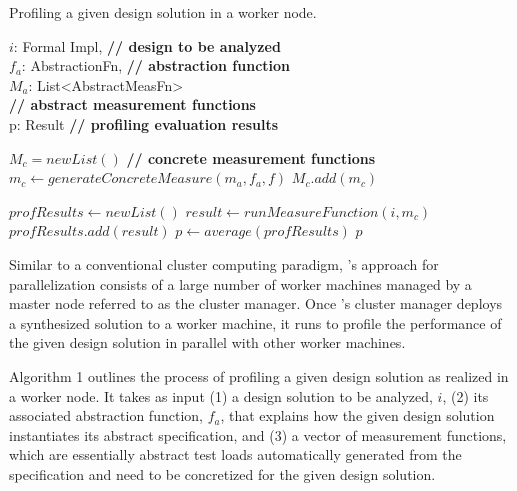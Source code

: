 \documentclass{sig-alternate}
\begin{document}
\begin{algorithm}[tb]
\caption{Profiling a given design solution in a worker node.} %
\label{alg:para_eval}
\begin{algorithmic}[1]
\REQUIRE $i$: Formal Impl, \textcolor{comments}{\textbf{// design to be analyzed}} \\
 		 $f_a$: AbstractionFn, \textcolor{comments}{\textbf{// abstraction function}} \\
		$M_a$: List<AbstractMeasFn> \\\textcolor{comments}{\textbf{// abstract measurement functions}} \\ 
\ENSURE p: Result \textcolor{comments}{\textbf{// profiling evaluation results}}

\STATE $M_c = new List()$ \textcolor{comments}{\textbf{// concrete measurement functions}} \\ 
	\STATE $m_c \gets generateConcreteMeasure(m_a, f_a, f)$
	\STATE $M_c.add(m_c)$
\ENDFOR

\STATE $profResults \gets new List()$
		\STATE $result \gets runMeasureFunction(i, m_c)$
		\STATE $profResults.add(result)$
	\ENDFOR
\ENDFOR
\STATE $p \gets average(profResults)$
\RETURN $p$
\end{algorithmic}
\end{algorithm}

Similar to a conventional cluster computing paradigm, \@approach's approach for parallelization  consists of a large number of worker machines managed by a master node referred to as the cluster manager.
Once \@approach's cluster manager deploys a synthesized solution to a worker machine,
it runs to profile the performance of the given design solution in parallel with other worker machines.

Algorithm 1 outlines the process of profiling a given design solution as realized in a worker node. 
It takes as input (1) a design solution to be analyzed, $i$, (2) its associated abstraction function, $f_a$, that explains how the given design solution instantiates its abstract specification, and (3) a vector of measurement functions, which are essentially abstract test loads automatically generated from the specification and need to be concretized for the given design solution. 
\end{document}
